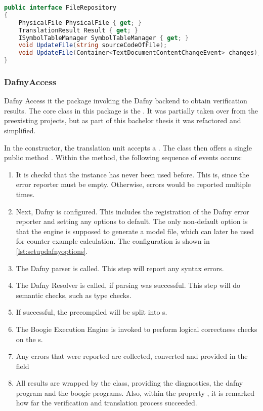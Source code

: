 \begin{lstlisting}[language=csharp, caption={Handling Compilation}, captionpos=b, label={lst:handlecompilation}]
public interface FileRepository
{
    PhysicalFile PhysicalFile { get; }
    TranslationResult Result { get; }
    ISymbolTableManager SymbolTableManager { get; }
    void UpdateFile(string sourceCodeOfFile);
    void UpdateFile(Container<TextDocumentContentChangeEvent> changes);
}
\end{lstlisting}


\subsubsection{DafnyAccess}
Dafny Access it the package invoking the Dafny backend to obtain verification results. The core class in this package is the . It was partially taken over from the preexisting projects, but as part of this bachelor thesis it was refactored and simplified.

In the constructor, the translation unit accepts a . The class then offers a single public method . Within the method, the following sequence of events occurs:
\begin{enumerate}
    \item It is checkd that the instance has never been used before. This is, since the error reporter must be empty. Otherwise, errors would be reported multiple times.
    \item Next, Dafny is configured. This includes the registration of the Dafny error reporter and setting any options to default. The only non-default option is that the engine is supposed to generate a model file, which can later be used for counter example calculation. The configuration is shown in \ref{lst:setupdafnyoptions}.
    \item The Dafny parser is called. This step will report any syntax errors.
    \item The Dafny Resolver is called, if parsing was successful. This step will do semantic checks, such as type checks.
    \item If successful, the precompiled  will be split into s.
    \item The Boogie Execution Engine is invoked to perform logical correctness checks on the s.
    \item Any errors that were reported are collected, converted and provided in the field 
    \item All results are wrapped by the  class, providing the diagnostics, the dafny program and the boogie programs. Also, within the property , it is remarked how far the verification and translation process succeeded.
\end{enumerate}

